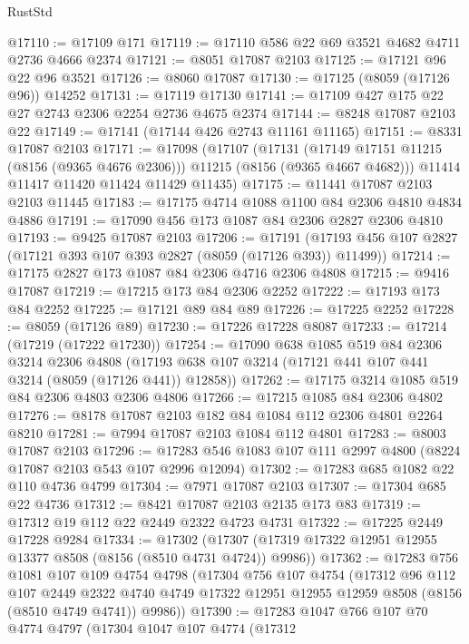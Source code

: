 \begin{lexlean}{RustStd}
\begin{coremodule}
@17110 := @17109 @171
@17119 := @17110 @586 @22 @69 @3521 @4682 @4711 @2736 @4666 @2374
@17121 := @8051 @17087 @2103
@17125 := @17121 @96 @22 @96 @3521
@17126 := @8060 @17087
@17130 := @17125 (@8059 (@17126 @96)) @14252
@17131 := @17119 @17130
@17141 := @17109 @427 @175 @22 @27 @2743 @2306 @2254 @2736 @4675 @2374
@17144 := @8248 @17087 @2103 @22
@17149 := @17141 (@17144 @426 @2743 @11161 @11165)
@17151 := @8331 @17087 @2103
@17171 := @17098
    (@17107
      (@17131 (@17149 @17151 @11215 (@8156 (@9365 @4676 @2306))) @11215 (@8156 (@9365 @4667 @4682)))
      @11414
      @11417
      @11420
      @11424
      @11429
      @11435)
@17175 := @11441 @17087 @2103 @2103 @11445
@17183 := @17175 @4714 @1088 @1100 @84 @2306 @4810 @4834 @4886
@17191 := @17090 @456 @173 @1087 @84 @2306 @2827 @2306 @4810
@17193 := @9425 @17087 @2103
@17206 := @17191 (@17193 @456 @107 @2827 (@17121 @393 @107 @393 @2827 (@8059 (@17126 @393)) @11499))
@17214 := @17175 @2827 @173 @1087 @84 @2306 @4716 @2306 @4808
@17215 := @9416 @17087
@17219 := @17215 @173 @84 @2306 @2252
@17222 := @17193 @173 @84 @2252
@17225 := @17121 @89 @84 @89
@17226 := @17225 @2252
@17228 := @8059 (@17126 @89)
@17230 := @17226 @17228 @8087
@17233 := @17214 (@17219 (@17222 @17230))
@17254 := @17090
    @638
    @1085
    @519
    @84
    @2306
    @3214
    @2306
    @4808
    (@17193 @638 @107 @3214 (@17121 @441 @107 @441 @3214 (@8059 (@17126 @441)) @12858))
@17262 := @17175 @3214 @1085 @519 @84 @2306 @4803 @2306 @4806
@17266 := @17215 @1085 @84 @2306 @4802
@17276 := @8178 @17087 @2103 @182 @84 @1084 @112 @2306 @4801 @2264 @8210
@17281 := @7994 @17087 @2103 @1084 @112 @4801
@17283 := @8003 @17087 @2103
@17296 := @17283 @546 @1083 @107 @111 @2997 @4800 (@8224 @17087 @2103 @543 @107 @2996 @12094)
@17302 := @17283 @685 @1082 @22 @110 @4736 @4799
@17304 := @7971 @17087 @2103
@17307 := @17304 @685 @22 @4736
@17312 := @8421 @17087 @2103 @2135 @173 @83
@17319 := @17312 @19 @112 @22 @2449 @2322 @4723 @4731
@17322 := @17225 @2449 @17228 @9284
@17334 := @17302
    (@17307 (@17319 @17322 @12951 @12955 @13377 @8508 (@8156 (@8510 @4731 @4724)) @9986))
@17362 := @17283
    @756
    @1081
    @107
    @109
    @4754
    @4798
    (@17304
      @756
      @107
      @4754
      (@17312
        @96
        @112
        @107
        @2449
        @2322
        @4740
        @4749
        @17322
        @12951
        @12955
        @12959
        @8508
        (@8156 (@8510 @4749 @4741))
        @9986))
@17390 := @17283
    @1047
    @766
    @107
    @70
    @4774
    @4797
    (@17304
      @1047
      @107
      @4774
      (@17312

\end{coremodule}
\end{lexlean}
